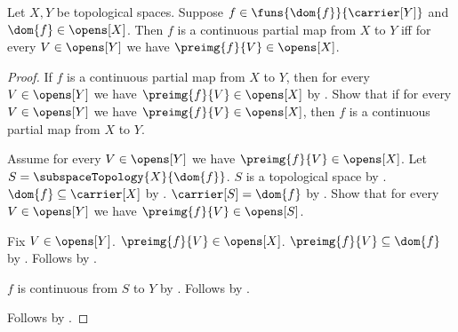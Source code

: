 \begin{theorem}\label{continuous_partial_map_iff_open_preimages}
    Let $X,Y$ be topological spaces.
    Suppose $f\in\funs{\dom{f}}{\carrier[Y]}$ and $\dom{f}\in\opens[X]$.
    Then $f$ is a continuous partial map from $X$ to $Y$ iff
        for every $V\in\opens[Y]$ we have $\preimg{f}{V}\in\opens[X]$.
\end{theorem}
\begin{proof}
    If $f$ is a continuous partial map from $X$ to $Y$, then
        for every $V\in\opens[Y]$ we have $\preimg{f}{V}\in\opens[X]$ by
        .
    Show that if for every $V\in\opens[Y]$ we have $\preimg{f}{V}\in\opens[X]$,
        then $f$ is a continuous partial map from $X$ to $Y$.
    \begin{subproof}
        Assume for every $V\in\opens[Y]$ we have $\preimg{f}{V}\in\opens[X]$.
        Let $S=\subspaceTopology{X}{\dom{f}}$.
        $S$ is a topological space by .
        $\dom{f}\subseteq\carrier[X]$ by .
        $\carrier[S]=\dom{f}$ by .
        Show that for every $V\in\opens[Y]$ we have $\preimg{f}{V}\in\opens[S]$.
        \begin{subproof}
            Fix $V\in\opens[Y]$.
            $\preimg{f}{V}\in\opens[X]$.
            $\preimg{f}{V}\subseteq\dom{f}$ by .
            Follows by .
        \end{subproof}
        $f$ is continuous from $S$ to $Y$ by .
        Follows by .
    \end{subproof}
    Follows by \auto.
\end{proof}

